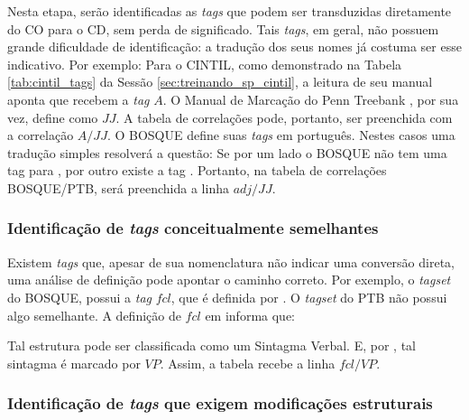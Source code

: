 Nesta etapa, serão identificadas as \textit{tags} que podem ser transduzidas diretamente do CO para o CD, sem perda de significado. Tais \textit{tags}, em geral, não possuem grande dificuldade de identificação: a tradução dos seus nomes já costuma ser esse indicativo. Por exemplo: Para o CINTIL, como demonstrado na Tabela \ref{tab:cintil_tags} da Sessão \ref{sec:treinando_sp_cintil}, a leitura de seu manual \cite[p~4]{cintil_handbook} aponta que  recebem a \textit{tag} $A$. O Manual de Marcação do Penn Treebank \cite[p~1]{posPTBguidelines}, por sua vez, define  como $JJ$. A tabela de correlações pode, portanto, ser preenchida com a correlação $A / JJ$. O BOSQUE define suas \textit{tags} em português. Nestes casos uma tradução simples resolverá a questão: Se por um lado o BOSQUE não tem uma tag para , por outro existe a tag . Portanto, na tabela de correlações BOSQUE/PTB, será preenchida a linha $adj / JJ$.

\subsubsection{Identificação de \textit{tags} conceitualmente semelhantes}
\label{subsubsec:tags_conceit_semelhantes}

Existem \textit{tags} que, apesar de sua nomenclatura não indicar uma conversão direta, uma análise de definição pode apontar o caminho correto. Por exemplo, o \textit{tagset} do BOSQUE, possui a \textit{tag} $fcl$, que é definida por . O \textit{tagset} do PTB não possui algo semelhante. A definição de $fcl$ em \cite[p~12]{afonso2006arvores} informa que:

\begin{quote}
\end{quote}

Tal estrutura pode ser classificada como um Sintagma Verbal. E, por \cite[p~321]{buildingPTB}, tal sintagma é marcado por $VP$. Assim, a tabela recebe a linha $fcl / VP$.

\subsubsection{Identificação de \textit{tags} que exigem modificações estruturais}
\label{subsubsec:tags_mudancas_estruturais}

